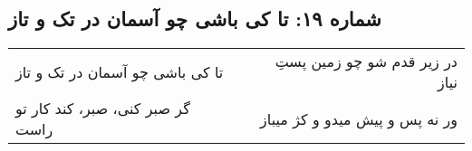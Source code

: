 \begin{center}
\section*{شماره ۱۹: تا کی باشی چو آسمان در تک و تاز}
\label{sec:019}
\begin{longtable}{l p{0.5cm} r}
تا کی باشی چو آسمان در تک و تاز
&&
در زیر قدم شو چو زمین پستِ نیاز
\\
گر صبر کنی، صبر، کند کار تو راست
&&
ور نه پس و پیش میدو و کژ میباز
\\
\end{longtable}
\end{center}

